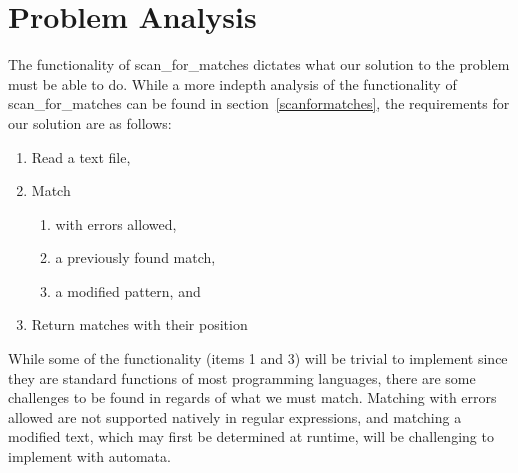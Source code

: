 \section{Problem Analysis}\label{probanal}
The functionality of scan\_for\_matches dictates what our solution to the 
problem must be able to do. While a more indepth analysis of the functionality 
of scan\_for\_matches can be found in section~\ref{scanformatches}, 
the requirements for our solution are as follows:
\begin{enumerate}
\item Read a text file,
\item Match
\begin{enumerate}
\item with errors allowed,
\item a previously found match,
\item a modified pattern, and
\end{enumerate}
\item Return matches with their position
\end{enumerate}
While some of the functionality (items 1 and 3) will be trivial to implement 
since they are standard functions of most programming languages, there are 
some challenges to be found in regards of what we must match. Matching with 
errors allowed are not supported natively in regular expressions, and 
matching a modified text, which may first be determined at runtime, will be 
challenging to implement with automata.
